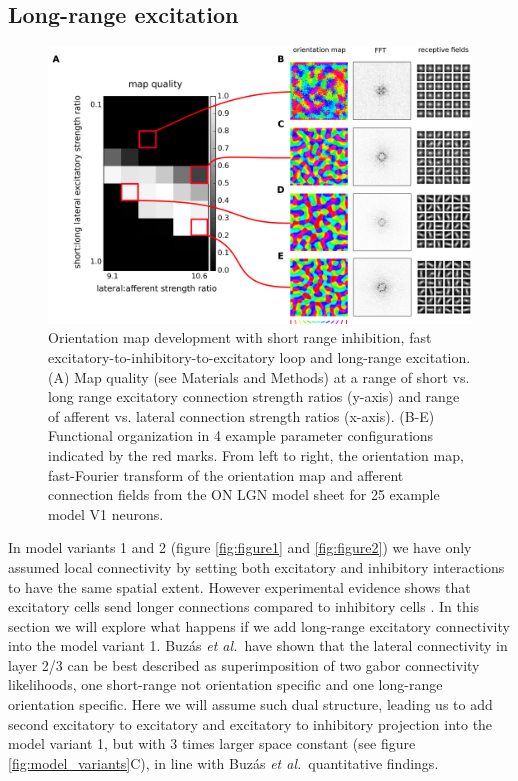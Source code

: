 \documentclass[utf8]{frontiersSCNS}
\newcommand{\etal}{\textit{et al.}}
\begin{document}
\subsection{Long-range excitation} \label{sec:SM3}

\begin{figure}[htpb!] 
\centering
\includegraphics[width=16cm]{./SVG/Figure3/figure3.png}
\caption{Orientation map development with short range inhibition, fast excitatory-to-inhibitory-to-excitatory loop and long-range excitation. (A) Map quality (see Materials and Methods) at a range of 
short vs. long range excitatory connection strength ratios (y-axis) and range of afferent vs. lateral connection strength ratios (x-axis). (B-E) Functional organization in 4 example parameter configurations 
indicated by the red marks. From left to right, the orientation map, fast-Fourier transform of the orientation map and afferent connection fields from the ON LGN model sheet for 25 example model V1 neurons.}
\label{fig:figure3}
\end{figure} 

In model variants 1 and 2 (figure \ref{fig:figure1} and \ref{fig:figure2}) we have only assumed local connectivity by setting both excitatory and inhibitory interactions to have the same spatial extent. 
However experimental evidence shows that excitatory cells send longer connections compared to inhibitory cells \citep{Buzas2006,Budd2001}. In this section we will explore what happens if we add long-range excitatory connectivity into the model variant 1. Buz\'as \etal\,\citep{Buzas2006} have
shown that the lateral connectivity in layer 2/3 can be best described as superimposition of two gabor connectivity likelihoods, one short-range not orientation 
specific and one long-range orientation specific. Here we will assume such dual structure, leading us to add second excitatory to excitatory and excitatory to 
inhibitory projection into the model variant 1, but with 3 times larger space constant (see figure \ref{fig:model_variants}C), in line with Buz\'as \etal \, \citep{Buzas2006} quantitative findings. 
\end{document}
